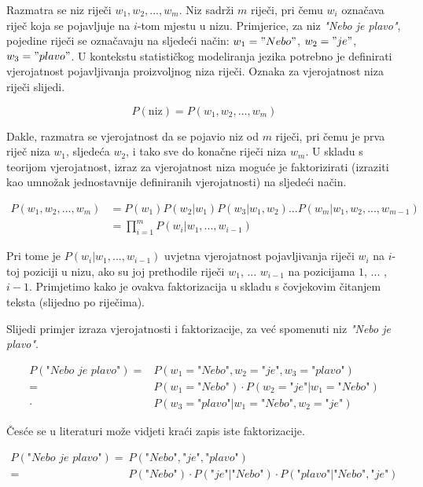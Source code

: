 \documentclass[times, utf8, diplomski, numeric]{fer}
\begin{document}
Razmatra se niz riječi $w_1, w_2, ... , w_m$. Niz sadrži $m$ riječi, pri čemu $w_i$ označava riječ koja se pojavljuje na $i$-tom mjestu u nizu. Primjerice, za niz \textit{"Nebo je plavo"}, pojedine riječi se označavaju na sljedeći način: $w_1="Nebo"$, $w_2="je"$, $w_3="plavo"$. U kontekstu statističkog modeliranja jezika potrebno je definirati vjerojatnost pojavljivanja proizvoljnog niza riječi. Oznaka za vjerojatnost niza riječi slijedi.

\[
P(\text{niz}) = P(w_1, w_2, ... , w_m)
\]

Dakle, razmatra se vjerojatnost da se pojavio niz od $m$ riječi, pri čemu je prva riječ niza $w_1$, sljedeća $w_2$, i tako sve do konačne riječi niza $w_m$. U skladu s teorijom vjerojatnost, izraz za vjerojatnost niza moguće je faktorizirati (izraziti kao umnožak jednostavnije definiranih vjerojatnosti) na sljedeći način.

\begin{align*}
P(w_1, w_2, ... , w_m)
  &= P(w_1) P(w_2 | w_1) P(w_3 | w_1, w_2) ... P(w_m | w_1, w_2, ... , w_{m - 1 }) \\
  &= \prod_{i = 1}^m{P(w_i|w_1, ... , w_{i - 1})}
\end{align*}

Pri tome je $P(w_i | w_1, ... , w_{i - 1})$ uvjetna vjerojatnost pojavljivanja riječi $w_i$ na $i$-toj poziciji u nizu, ako su joj prethodile riječi $w_1$, ... $w_{i - 1}$ na pozicijama $1$, ... , $i - 1$. Primjetimo kako je ovakva faktorizacija u skladu s čovjekovim čitanjem teksta (slijedno po riječima).

Slijedi primjer izraza vjerojatnosti i faktorizacije, za već spomenuti niz \textit{"Nebo je plavo"}.

\begin{align*}
P(\textit{"Nebo je plavo"})
  = &P(w_1=\textit{"Nebo"}, w_2=\textit{"je"}, w_3=\textit{"plavo"}) \\
  = &P(w_1=\textit{"Nebo"}) \cdot P(w_2=\textit{"je"} | w_1=\textit{"Nebo"}) \\
  \cdot &P(w_3=\textit{"plavo"} | w_1=\textit{"Nebo"}, w_2=\textit{"je"})
\end{align*}

Česće se u literaturi može vidjeti kraći zapis iste faktorizacije.

\begin{align*}
P(\textit{"Nebo je plavo"})
  = &P(\textit{"Nebo"}, \textit{"je"}, \textit{"plavo"}) \\
  = &P(\textit{"Nebo"}) \cdot P(\textit{"je"} | \textit{"Nebo"}) \cdot P(\textit{"plavo"} | \textit{"Nebo"}, \textit{"je"})
\end{align*}
\end{document}

